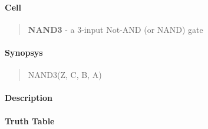 \label{NAND3}
\paragraph{Cell}
\begin{quote}
    \textbf{NAND3} - a 3-input Not-AND (or NAND) gate
\end{quote}

\paragraph{Synopsys}
\begin{quote}
    NAND3(Z, C, B, A)
\end{quote}

\paragraph{Description}



\paragraph{Truth Table}



